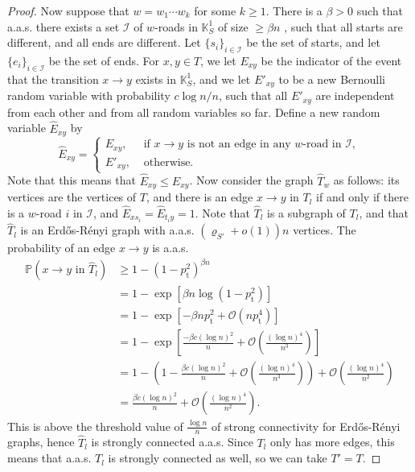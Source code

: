 \documentclass[runngingheads]{llncs}
\newcommand\recht\operatorname
\begin{document}
\begin{proof}
Now suppose that $w = w_1\cdots w_k$ for some $k \geq 1$. There is a $\beta > 0$ such that a.a.s. there exists a set $\mathcal{I}$ of $w$-roads in $\mathbb{K}^1_S$ of size $\geq \beta n$ , such that all starts are different, and all ends are different. Let $\{s_i\}_{i \in \mathcal{I}}$ be the set of starts, and let $\{e_i\}_{i \in \mathcal{I}}$ be the set of ends. For $x,y \in T$, we let $E_{xy}$ be the indicator of the event that the transition $x \rightarrow y$ exists in $\mathbb{K}^1_S$, and we let $E'_{xy}$ to be a new Bernoulli random variable with probability $c\log n/n$, such that all $E'_{xy}$ are independent from each other and from all random variables so far. Define a new random variable $\hat{E}_{xy}$ by
\[
\hat{E}_{xy} = \begin{cases}E_{xy}, & \textrm{ if $x \rightarrow y$ is not an edge in any $w$-road in $\mathcal{I}$},\\
E'_{xy}, & \textrm{ otherwise.}
\end{cases}
\]
Note that this means that $\hat{E}_{xy} \leq E_{xy}$. Now consider the graph $\hat{T}_w$ as follows: its vertices are the vertices of $T$, and there is an edge $x \rightarrow y$ in $T_l$ if and only if there is a $w$-road $i$ in $\mathcal{I}$, and $\hat{E}_{xs_i} = \hat{E}_{t_iy} = 1$. Note that $\hat{T}_l$ is a subgraph of $T_l$, and that $\hat{T}_l$ is an Erd\H{o}s-Rényi graph with a.a.s. $(\varrho_{S'}+o(1))n$ vertices. The probability of an edge $x \rightarrow y$ is a.a.s.
\begin{align*}
\mathbb{P}(x \rightarrow y \textrm{ in $\hat{T}_l$}) &\geq 1-(1-p_{\recht{t}}^2)^{\beta n}\\
&= 1-\operatorname{exp}\left[\beta n\log(1-p_{\recht{t}}^2)\right]\\
&= 1-\operatorname{exp}\left[-\beta np_{\recht{t}}^2 + \mathcal{O}(np_{\recht{t}}^4)\right]\\
&= 1-\operatorname{exp}\left[\tfrac{-\beta c (\log n)^2}{n}+\mathcal{O}\left(\tfrac{(\log n)^4}{n^3}\right)\right]\\
&= 1- \left(1-\tfrac{\beta c (\log n)^2}{n}+\mathcal{O}\left(\tfrac{(\log n)^4}{n^3}\right)\right)+\mathcal{O}\left(\tfrac{(\log n)^4}{n^2}\right)\\
&= \tfrac{\beta c (\log n)^2}{n} +\mathcal{O}\left(\tfrac{(\log n)^4}{n^2}\right).
\end{align*}
This is above the threshold value of $\frac{\log n}{n}$ of strong connectivity for Erd\H{o}s-R\'enyi graphs, hence $\hat{T}_l$ is strongly connected a.a.s. Since $T_l$ only has more edges, this means that a.a.s. $T_l$ is strongly connected as well, so we can take $T'= T$.
\end{proof}
\end{document}
